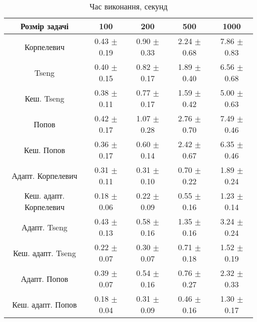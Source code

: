 \begin{table}[H]
	\centering
	\begin{tabular}{|c||c|c|c|c|}\hline
		Розмір задачі & 100 & 200 & 500 & 1000 \\ \hline \hline
		Корпелевич & 0.43 $\pm$ 0.19 & 0.90 $\pm$ 0.33 & 2.24 $\pm$ 0.68 & 7.86 $\pm$ 0.83 \\ \hline
		Tseng & 0.40 $\pm$ 0.15 & 0.82 $\pm$ 0.17 & 1.89 $\pm$ 0.40 & 6.56 $\pm$ 0.68 \\ \hline
		Кеш. Tseng & 0.38 $\pm$ 0.11 & 0.77 $\pm$ 0.17 & 1.59 $\pm$ 0.42 & 5.00 $\pm$ 0.63 \\ \hline
		Попов & 0.42 $\pm$ 0.17 & 1.07 $\pm$ 0.28 & 2.76 $\pm$ 0.70 & 7.49 $\pm$ 0.46 \\ \hline
		Кеш. Попов & 0.36 $\pm$ 0.17 & 0.60 $\pm$ 0.14 & 2.42 $\pm$ 0.67 & 6.35 $\pm$ 0.46 \\ \hline \hline
		Адапт. Корпелевич & 0.31 $\pm$ 0.11 & 0.31 $\pm$ 0.10 & 0.70 $\pm$ 0.22 & 1.89 $\pm$ 0.24 \\ \hline
		Кеш. адапт. Корпелевич & 0.18 $\pm$ 0.06 & 0.22 $\pm$ 0.09 & 0.55 $\pm$ 0.16 & 1.23 $\pm$ 0.14 \\ \hline
		Адапт. Tseng & 0.43 $\pm$ 0.13 & 0.58 $\pm$ 0.16 & 1.35 $\pm$ 0.16 & 3.24 $\pm$ 0.24 \\ \hline
		Кеш. адапт. Tseng & 0.22 $\pm$ 0.07 & 0.30 $\pm$ 0.07 & 0.71 $\pm$ 0.18 & 1.52 $\pm$ 0.19 \\ \hline
		Адапт. Попов & 0.39 $\pm$ 0.07 & 0.54 $\pm$ 0.16 & 0.76 $\pm$ 0.27 & 2.32 $\pm$ 0.33 \\ \hline
		Кеш. адапт. Попов & 0.18 $\pm$ 0.04 & 0.31 $\pm$ 0.09 & 0.46 $\pm$ 0.16 & 1.30 $\pm$ 0.17 \\ \hline
	\end{tabular}
	\caption{Час виконання, секунд}
\end{table}
